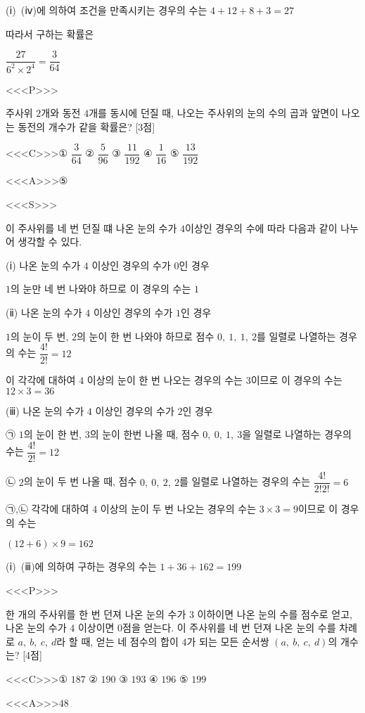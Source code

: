 \documentclass{oblivoir}
\begin{document}
(ⅰ)~(ⅳ)에 의하여 조건을 만족시키는 경우의 수는 $4+12+8+3=27$

따라서 구하는 확률은

$\dfrac{27}{6^{2}\times 2^{4}}=\dfrac{3}{64}$

<<<P>>>

주사위 $2$개와 동전 $4$개를 동시에 던질 때, 나오는 주사위의 눈의 수의 곱과 앞면이 나오는 동전의 개수가 같을 확률은? [3점]

<<<C>>>① $\dfrac{3}{64}$ ② $\dfrac{5}{96}$ ③ $\dfrac{11}{192}$ ④ $\dfrac{1}{16}$ ⑤ $\dfrac{13}{192}$

<<<A>>>⑤

<<<S>>>

이 주사위를 네 번 던질 떄 나온 눈의 수가 $4$이상인 경우의 수에 따라 다음과 같이 나누어 생각할 수 있다.

(ⅰ) 나온 눈의 수가 $4$ 이상인 경우의 수가 $0$인 경우

$1$의 눈만 네 번 나와야 하므로 이 경우의 수는 $1$

(ⅱ) 나온 눈의 수가 $4$ 이상인 경우의 수가 $1$인 경우

$1$의 눈이 두 번, $2$의 눈이 한 번 나와야 하므로 점수 $0,\: 1,\: 1,\: 2$를 일렬로 나열하는 경우의 수는 $\dfrac{4!}{2!}=12$

이 각각에 대하여 $4$ 이상의 눈이 한 번 나오는 경우의 수는 $3$이므로 이 경우의 수는 $12\times 3=36$

(ⅲ) 나온 눈의 수가 $4$ 이상인 경우의 수가 $2$인 경우

㉠ $1$의 눈이 한 번, $3$의 눈이 한번 나올 때, 점수 $0,\: 0,\: 1,\: 3$을 일렬로 나열하는 경우의 수는 $\dfrac{4!}{2!}=12$

㉡ $2$의 눈이 두 번 나올 때, 점수 $0,\: 0,\: 2,\: 2$를 일렬로 나열하는 경우의 수는 $\dfrac{4!}{2!2!}=6$

㉠,㉡ 각각에 대하여 $4$ 이상의 눈이 두 번 나오는 경우의 수는 $3\times 3=9$이므로 이 경우의 수는

$(12+6)\times 9=162$

(ⅰ)~(ⅲ)에 의하여 구하는 경우의 수는 $1+36+162=199$

<<<P>>>

한 개의 주사위를 한 번 던져 나온 눈의 수가 $3$ 이하이면 나온 눈의 수를 점수로 얻고, 나온 눈의 수가 $4$ 이상이면 $0$점을 얻는다. 이 주사위를 네 번 던져 나온 눈의 수를 차례로 $a,\: b,\: c,\: d$라 할 때, 얻는 네 점수의 합이 $4$가 되는 모든 순서쌍 $(a,\: b,\: c,\: d)$의 개수는? [4점]

<<<C>>>① $187$ ② $190$ ③ $193$ ④ $196$ ⑤ $199$

<<<A>>>$48$
\end{document}
